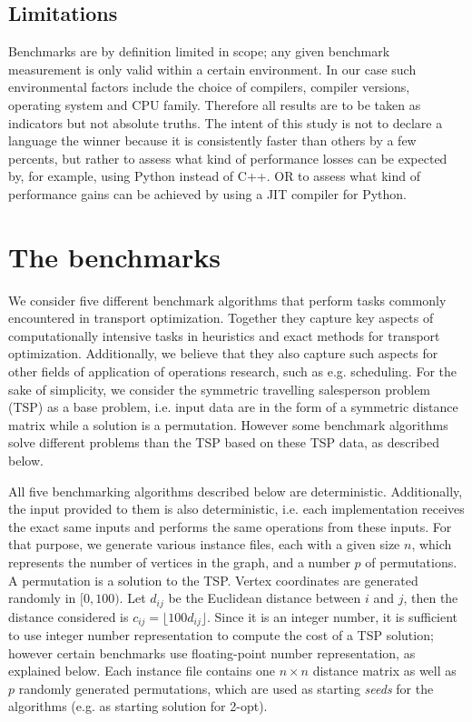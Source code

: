\documentclass[11pt,a4paper,notitlepage]{article}
\begin{document}
\subsection{Limitations}
Benchmarks are by definition limited in scope; any given benchmark
measurement is only valid within a certain environment. In our case
such environmental factors include the choice of compilers, compiler
versions, operating system and CPU family. Therefore all results are
to be taken as indicators but not absolute truths. The intent of this
study is not to declare a language the winner because it is
consistently faster than others by a few percents, but rather to
assess what kind of performance losses can be expected by, for
example, using Python instead of C++. OR to assess what kind of
performance gains can be achieved by using a JIT compiler for Python.

\section{The benchmarks}
We consider five different benchmark algorithms that perform tasks
commonly encountered in transport optimization. Together they capture
key aspects of computationally intensive tasks in heuristics and
exact methods for transport optimization. Additionally, we believe
that they also capture such aspects for other fields of application
of operations research, such as e.g. scheduling. For the sake of
simplicity, we consider the symmetric travelling salesperson problem
(TSP) as a base problem, i.e. input data are in the form of a
symmetric distance matrix while a solution is a permutation. However
some benchmark algorithms solve different problems than the TSP based on these
TSP data, as described below.

All five benchmarking algorithms described below are deterministic.
Additionally, the input provided to them is also deterministic,
i.e. each implementation receives the exact same inputs and performs
the same operations from these inputs. For that purpose, we generate
various instance files, each with a given size $n$, which represents
the number of vertices in the graph, and a number $p$ of
permutations. A permutation is a solution to the TSP.
Vertex coordinates are generated randomly in $[0, 100)$. Let $d_{ij}$
be the Euclidean distance between $i$ and $j$, then the distance
considered is $c_{ij} = \lfloor 100 d_{ij} \rfloor$. Since it is an
integer number, it is sufficient to use integer number representation
to compute the cost of a TSP solution; however certain benchmarks use
floating-point number representation, as explained below.
Each instance
file contains one $n \times n$ distance matrix as well as $p$ randomly
generated permutations, which are used as starting \emph{seeds} for
the algorithms (e.g. as starting solution for 2-opt).
\end{document}
